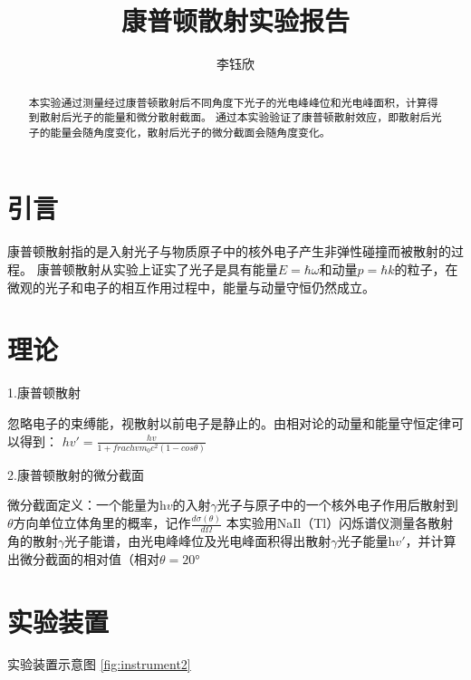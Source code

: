 \documentclass[font=default]{mpltx}
\makeatletter
\newcommand\releasedate{%
    \href{https://github.com/CastleStar14654/PKUMpLtX/releases/tag/\mpltx@fileversion}%
        {\mpltx@filedate, \mpltx@fileversion}}
\makeatother
\begin{document}
\title{康普顿散射实验报告} %
\author{李钰欣} %
\date{}
\begin{abstract}
  本实验通过测量经过康普顿散射后不同角度下光子的光电峰峰位和光电峰面积，计算得到散射后光子的能量和微分散射截面。
  通过本实验验证了康普顿散射效应，即散射后光子的能量会随角度变化，散射后光子的微分截面会随角度变化。
\end{abstract}

\maketitle

\section{引言}

康普顿散射指的是入射光子与物质原子中的核外电子产生非弹性碰撞而被散射的过程。
康普顿散射从实验上证实了光子是具有能量$E = \hbar \omega$和动量$p = \hbar k$的粒子，在微观的光子和电子的相互作用过程中，能量与动量守恒仍然成立。

 
\section{理论}\label{sec:theory}
1.康普顿散射

忽略电子的束缚能，视散射以前电子是静止的。由相对论的动量和能量守恒定律可以得到：
$h \mathit{v}' = \frac{h \mathit{v}}{1+ frac{h \mathit{v}}{m_0 c^2}(1-cos \theta)}$

2.康普顿散射的微分截面

微分截面定义：一个能量为h$v$的入射$\gamma$光子与原子中的一个核外电子作用后散射到$\theta$方向单位立体角里的概率，记作$\frac{d \sigma (\theta)}{d \Omega}$
本实验用NaIl（Tl）闪烁谱仪测量各散射角的散射$\gamma$光子能谱，由光电峰峰位及光电峰面积得出散射$\gamma$光子能量h$v'$，并计算出微分截面的相对值（相对$\theta = 20$°



\section{实验装置}
实验装置示意图 \autoref{fig:instrument2}
\end{document}
